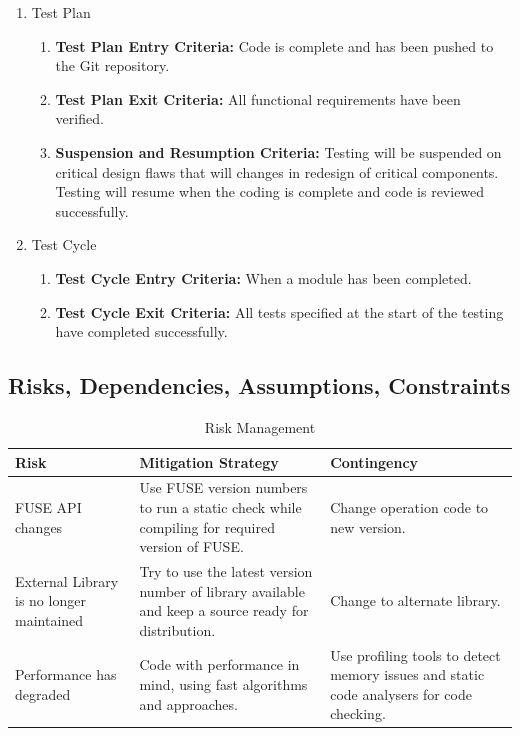 \begin{enumerate}
\item Test Plan
\begin{enumerate}[label=\Alph*]
\item \textbf{Test Plan Entry Criteria:} Code is complete and has been pushed to the Git repository.
\item \textbf{Test Plan Exit Criteria:} All functional requirements have been verified.
\item \textbf{Suspension and Resumption Criteria:} Testing will be suspended on critical
design flaws that will changes in redesign of critical components. Testing will resume when the coding is complete and code is reviewed successfully.
\end{enumerate}

\item Test Cycle
\begin{enumerate}[label=\Alph*]
\item \textbf{Test Cycle Entry Criteria:} When a module has been completed.
\item\textbf{ Test Cycle Exit Criteria:} All tests specified at the start of the testing have
completed successfully.
\end{enumerate}
\end{enumerate}

\subsection{Risks, Dependencies, Assumptions, Constraints}
\begin{table}[h]
\begin{tabular}{|p{2cm}|p{8cm}|p{4cm}|}
\hline
\textbf{Risk} & \textbf{Mitigation Strategy} & \textbf{Contingency} \\ \hline
FUSE API changes & Use FUSE version numbers to run a static check while compiling for required version of FUSE. & Change operation code to new version. \\ \hline
External Library is no longer maintained & Try to use the latest version number of library available and keep a source ready for distribution. & Change to alternate library. \\ \hline
Performance has degraded & Code with performance in mind, using fast algorithms and approaches. & Use profiling tools to detect memory issues and static code analysers for code checking. \\
\hline
\end{tabular}
\caption{Risk Management}
\label{tab: risk}
\end{table}

